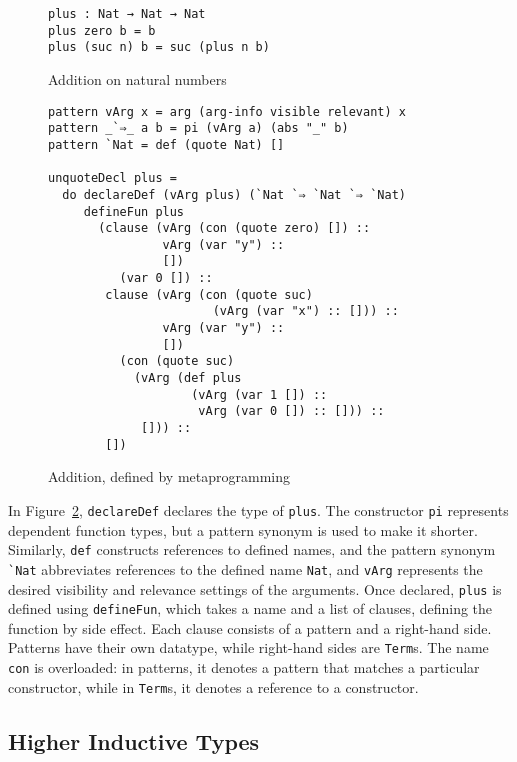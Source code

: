 \documentclass[sigplan,10pt]{acmart}
\begin{document}
\begin{figure}[h]
\begin{Verbatim}
plus : Nat → Nat → Nat
plus zero b = b
plus (suc n) b = suc (plus n b)
\end{Verbatim}
  \caption{Addition on natural numbers}
  \label{fig:plus}
\end{figure}

\begin{figure}
\begingroup
\fontsize{9pt}{10pt}\selectfont
\begin{Verbatim}
pattern vArg x = arg (arg-info visible relevant) x
pattern _`⇒_ a b = pi (vArg a) (abs "_" b)
pattern `Nat = def (quote Nat) []

unquoteDecl plus =
  do declareDef (vArg plus) (`Nat `⇒ `Nat `⇒ `Nat)
     defineFun plus
       (clause (vArg (con (quote zero) []) ::
                vArg (var "y") ::
                [])
          (var 0 []) ::
        clause (vArg (con (quote suc)
                       (vArg (var "x") :: [])) ::
                vArg (var "y") ::
                [])
          (con (quote suc)
            (vArg (def plus
                    (vArg (var 1 []) ::
                     vArg (var 0 []) :: [])) ::
             [])) ::
        [])
\end{Verbatim}
\endgroup
\caption{Addition, defined by metaprogramming}
\label{fig:plusmeta}
\end{figure}
\normalsize

In Figure~\ref{fig:plusmeta}, {\tt declareDef} declares the type of {\tt plus}.
The constructor {\tt pi} represents dependent function types, but a pattern synonym is used to make it shorter.
Similarly, \texttt{def} constructs references to defined names, and the pattern synonym \Verb|`Nat| abbreviates references to the defined name \texttt{Nat}, and {\tt vArg} represents the desired visibility and relevance settings of the arguments.
Once declared, \texttt{plus} is defined using {\tt defineFun}, which takes a name and a list of clauses, defining the function by side effect.
Each clause consists of a pattern and a right-hand side.
Patterns have their own datatype, while right-hand sides are \texttt{Term}s.
The name \texttt{con} is overloaded: in patterns, it denotes a pattern that matches a particular constructor, while in \texttt{Term}s, it denotes a reference to a constructor.


\subsection{Higher Inductive Types}
\label{sec:sec2.2}
\end{document}
